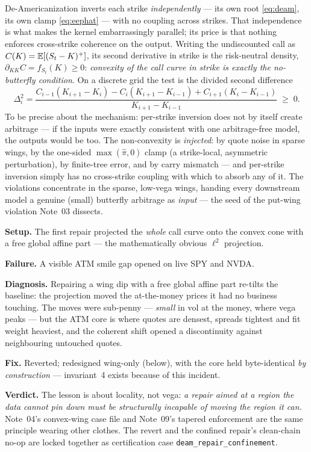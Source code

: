 \documentclass[11pt]{article}
\begin{document}
De-Americanization inverts each strike \emph{independently} --- its own
root \eqref{eq:deam}, its own clamp \eqref{eq:eephat} --- with no coupling
across strikes.  That independence is what makes the kernel embarrassingly
parallel; its price is that nothing enforces cross-strike coherence on the
output.  Writing the undiscounted call as $C(K)=\mathbb{E}[(S_t-K)^+]$, its second
derivative in strike is the risk-neutral density,
$\partial_{KK}C=f_{S_t}(K)\ge0$: \emph{convexity of the call curve in
strike is exactly the no-butterfly condition}.  On a discrete grid the
test is the divided second difference
\begin{equation}
\Delta^2_i=\frac{C_{i-1}(K_{i+1}-K_i)-C_i(K_{i+1}-K_{i-1})+C_{i+1}(K_i-K_{i-1})}
{K_{i+1}-K_{i-1}}\;\ge\;0 .
\label{eq:bfly}
\end{equation}
To be precise about the mechanism: per-strike inversion does not by itself
create arbitrage --- if the inputs were exactly consistent with one
arbitrage-free model, the outputs would be too.  The non-convexity is
\emph{injected}: by quote noise in sparse wings, by the one-sided
$\max(\hat\pi,0)$ clamp (a strike-local, asymmetric perturbation), by
finite-tree error, and by carry mismatch --- and per-strike inversion
simply has no cross-strike coupling with which to absorb any of it.  The
violations concentrate in the sparse, low-vega wings, handing every
downstream model a genuine (small) butterfly arbitrage as \emph{input} ---
the seed of the put-wing violation Note~03 dissects.

\begin{example}[title={Case file: the repair that moved the money}]
\textbf{Setup.}  The first repair projected the \emph{whole} call curve
onto the convex cone with a free global affine part --- the
mathematically obvious $\ell^2$ projection.

\textbf{Failure.}  A visible ATM smile gap opened on live SPY and NVDA.

\textbf{Diagnosis.}  Repairing a wing dip with a free global affine part
re-tilts the baseline: the projection moved the at-the-money prices it had
no business touching.  The moves were sub-penny --- \emph{small} in vol at
the money, where vega peaks --- but the ATM core is where quotes are
densest, spreads tightest and fit weight heaviest, and the coherent shift
opened a discontinuity against neighbouring untouched quotes.

\textbf{Fix.}  Reverted; redesigned wing-only (below), with the core held
byte-identical \emph{by construction} --- invariant~4 exists because of
this incident.

\textbf{Verdict.}  The lesson is about locality, not vega: \emph{a repair
aimed at a region the data cannot pin down must be structurally incapable
of moving the region it can.}  Note~04's convex-wing case file and
Note~09's tapered enforcement are the same principle wearing other
clothes.  The revert and the confined repair's clean-chain no-op are
locked together as certification case \texttt{deam\_repair\_confinement}.
\end{example}
\end{document}
